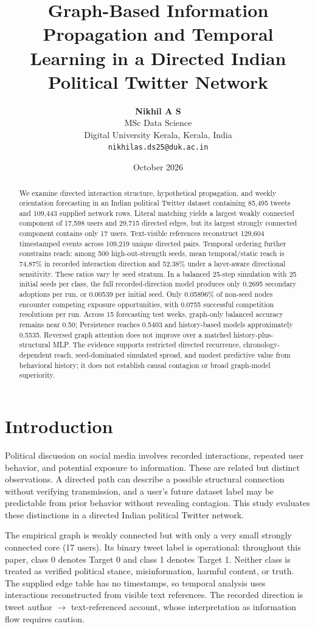 \documentclass[11pt,a4paper]{article}
\title{\textbf{Graph-Based Information Propagation and Temporal Learning in a Directed Indian Political Twitter Network}}
\author{\textbf{Nikhil A S}\\MSc Data Science\\Digital University Kerala, Kerala, India\\\texttt{nikhilas.ds25@duk.ac.in}}
\date{October 2026}
\begin{document}
\maketitle

\begin{abstract}
We examine directed interaction structure, hypothetical propagation, and weekly orientation forecasting in an Indian political Twitter dataset containing 85,495 tweets and 109,443 supplied network rows. Literal matching yields a largest weakly connected component of 17,598 users and 29,715 directed edges, but its largest strongly connected component contains only 17 users. Text-visible references reconstruct 129,604 timestamped events across 109,219 unique directed pairs. Temporal ordering further constrains reach: among 500 high-out-strength seeds, mean temporal/static reach is 74.87\% in recorded interaction direction and 52.38\% under a layer-aware directional sensitivity. These ratios vary by seed stratum. In a balanced 25-step simulation with 25 initial seeds per class, the full recorded-direction model produces only 0.2695 secondary adoptions per run, or 0.00539 per initial seed. Only 0.05896\% of non-seed nodes encounter competing exposure opportunities, with 0.0755 successful competition resolutions per run. Across 15 forecasting test weeks, graph-only balanced accuracy remains near 0.50; Persistence reaches 0.5403 and history-based models approximately 0.5535. Reversed graph attention does not improve over a matched history-plus-structural MLP. The evidence supports restricted directed recurrence, chronology-dependent reach, seed-dominated simulated spread, and modest predictive value from behavioral history; it does not establish causal contagion or broad graph-model superiority.
\end{abstract}

\section{Introduction}
Political discussion on social media involves recorded interactions, repeated user behavior, and potential exposure to information. These are related but distinct observations. A directed path can describe a possible structural connection without verifying transmission, and a user's future dataset label may be predictable from prior behavior without revealing contagion. This study evaluates these distinctions in a directed Indian political Twitter network.

The empirical graph is weakly connected but with only a very small strongly connected core (17 users). Its binary tweet label is operational: throughout this paper, class 0 denotes Target 0 and class 1 denotes Target 1. Neither class is treated as verified political stance, misinformation, harmful content, or truth. The supplied edge table has no timestamps, so temporal analysis uses interactions reconstructed from visible text references. The recorded direction is tweet author $\rightarrow$ text-referenced account, whose interpretation as information flow requires caution.
\end{document}
